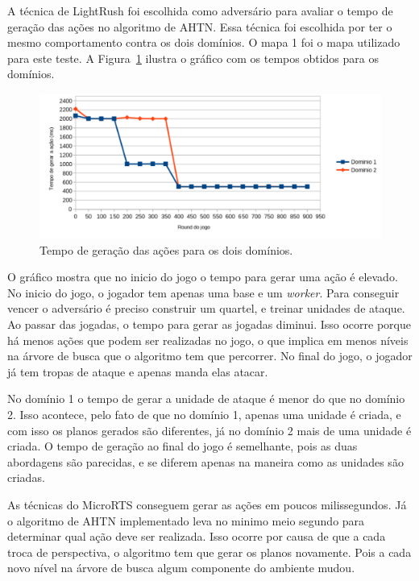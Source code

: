A técnica de LightRush foi escolhida como adversário para avaliar o tempo de geração das ações no algoritmo de AHTN.
Essa técnica foi escolhida por ter o mesmo comportamento contra os dois domínios.
O mapa 1 foi o mapa utilizado para este teste.
A Figura~\ref{fig:tempo} ilustra o gráfico com os tempos obtidos para os domínios.

\begin{figure}[ht]
	\centering
	\includegraphics[width=.9\textwidth]{fig/graph.pdf}
	\caption{Tempo de geração das ações para os dois domínios.}
	\label{fig:tempo}
\end{figure}

O gráfico mostra que no inicio do jogo o tempo para gerar uma ação é elevado.
No inicio do jogo, o jogador tem apenas uma base e um \textit{worker}.
Para conseguir vencer o adversário é preciso construir um quartel, e treinar unidades de ataque.
Ao passar das jogadas, o tempo para gerar as jogadas diminui.
Isso ocorre porque há menos ações que podem ser realizadas no jogo, o que implica em menos níveis na árvore de busca que o algoritmo tem que percorrer.
No final do jogo, o jogador já tem tropas de ataque e apenas manda elas atacar.

No domínio 1 o tempo de gerar a unidade de ataque é menor do que no domínio 2.
Isso acontece, pelo fato de que no domínio 1, apenas uma unidade é criada, e com isso os planos gerados são diferentes, já no domínio 2 mais de uma unidade é criada.
O tempo de geração ao final do jogo é semelhante, pois as duas abordagens são parecidas, e se diferem apenas na maneira como as unidades são criadas.

As técnicas do MicroRTS conseguem gerar as ações em poucos milissegundos.
Já o algoritmo de AHTN implementado leva no minimo meio segundo para determinar qual ação deve ser realizada.
Isso ocorre por causa de que a cada troca de perspectiva, o algoritmo tem que gerar os planos novamente.
Pois a cada novo nível na árvore de busca algum componente do ambiente mudou.


